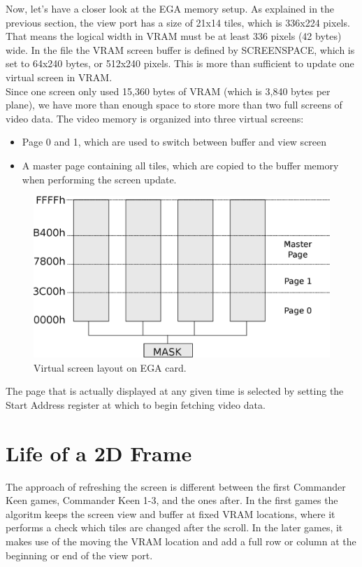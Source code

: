 \documentclass[book.tex]{subfiles}
\begin{document}
Now, let's have a closer look at the EGA memory setup. As explained in the previous section, the view port has a size of 21x14 tiles, which is 336x224 pixels. That means the logical width in VRAM must be at least 336 pixels (42 bytes) wide. In the file  the VRAM screen buffer is defined by SCREENSPACE, which is set to 64x240 bytes, or 512x240 pixels. This is more than sufficient to update one virtual screen in VRAM.\\

Since one screen only used 15,360 bytes of VRAM (which is 3,840 bytes per plane), we have more than enough space to store more than two full screens of video data. The video memory is organized into three virtual screens:
\begin{itemize}
\item Page 0 and 1, which are used to switch between buffer and view screen
\item A master page containing all tiles, which are copied to the buffer memory when performing the screen update.
\end{itemize}
\par

\begin{figure}[H]
\centering
\includegraphics[width=\textwidth]{imgs/drawings/ega_ram_architecture.eps}
\caption{Virtual screen layout on EGA card.}
\label{fig:ega_ram_arch}
\end{figure}

The page that is actually displayed at any given time is selected by setting the Start Address register at which to begin fetching video data.\\




\section{Life of a 2D Frame}
The approach of refreshing the screen is different between the first Commander Keen games, Commander Keen 1-3, and the ones after. In the first games the algoritm keeps the screen view and buffer at fixed VRAM locations, where it performs a check which tiles are changed after the scroll. In the later games, it makes use of the moving the VRAM location and add a full row or column at the beginning or end of the view port. 
\\
\end{document}
